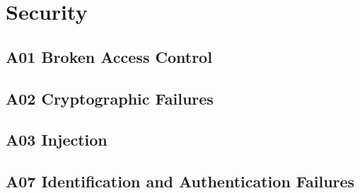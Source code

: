 
\section{Security}

\subsection{A01 Broken Access Control}

\subsection{A02 Cryptographic Failures}

\subsection{A03 Injection}

\subsection{A07 Identification and Authentication Failures}



